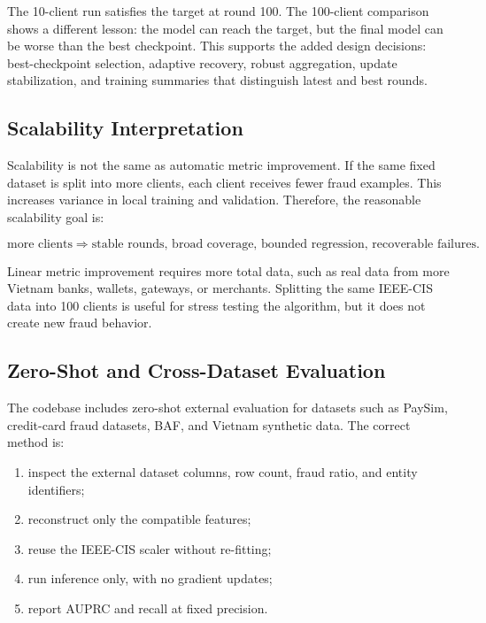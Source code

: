 \documentclass[conference]{IEEEtran}
\begin{document}
The 10-client run satisfies the target at round 100. The 100-client comparison
shows a different lesson: the model can reach the target, but the final model
can be worse than the best checkpoint. This supports the added design decisions:
best-checkpoint selection, adaptive recovery, robust aggregation, update
stabilization, and training summaries that distinguish latest and best rounds.

\subsection{Scalability Interpretation}

Scalability is not the same as automatic metric improvement. If the same fixed
dataset is split into more clients, each client receives fewer fraud examples.
This increases variance in local training and validation. Therefore, the
reasonable scalability goal is:

\begin{equation}
\text{more clients} \Rightarrow
\text{stable rounds, broad coverage, bounded regression, recoverable failures}.
\end{equation}

Linear metric improvement requires more total data, such as real data from more
Vietnam banks, wallets, gateways, or merchants. Splitting the same IEEE-CIS data
into 100 clients is useful for stress testing the algorithm, but it does not
create new fraud behavior.

\subsection{Zero-Shot and Cross-Dataset Evaluation}

The codebase includes zero-shot external evaluation for datasets such as PaySim,
credit-card fraud datasets, BAF, and Vietnam synthetic data. The correct method
is:

\begin{enumerate}
  \item inspect the external dataset columns, row count, fraud ratio, and entity
        identifiers;
  \item reconstruct only the compatible features;
  \item reuse the IEEE-CIS scaler without re-fitting;
  \item run inference only, with no gradient updates;
  \item report AUPRC and recall at fixed precision.
\end{enumerate}
\end{document}
